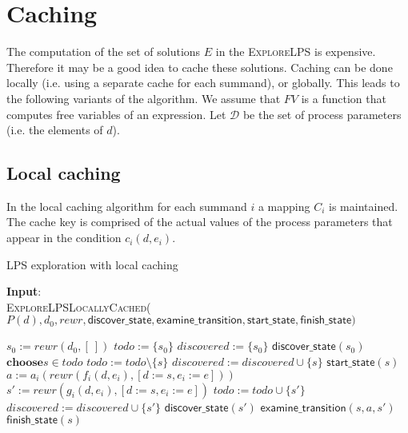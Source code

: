 \documentclass{article}
\newcommand{\emptymap}{\ensuremath{\{ : \}}}
\begin{document}
\newpage
\section{Caching}
The computation of the set of solutions $E$ in the \textsc{ExploreLPS} is expensive. Therefore it may be a good idea to cache these solutions. Caching can be done locally (i.e. using a separate cache for each summand),
or globally. This leads to the following variants of the algorithm. We assume that $FV$ is a function that
computes free variables of an expression. Let $\mathcal{D}$ be the set of process parameters
(i.e. the elements of $d$).

\subsection{Local caching}
In the local caching algorithm for each summand $i$ a mapping $C_i$ is maintained. The cache key is comprised of the actual values of the process parameters that appear in the condition $c_i(d, e_i)$.

\begin{algorithm}
\small
\caption{LPS exploration with local caching}
\vspace*{1ex}
{\textbf{Input}:} \\
\textsc{ExploreLPSLocallyCached}($P(d), d_0, rewr, \textsf{discover\_state}, \textsf{examine\_transition}, \textsf{start\_state}, \textsf{finish\_state})$
\begin{algorithmic}[1]
\State $s_0 := rewr(d_0, [\:])$
\State $todo := \{ s_0 \}$
\State $discovered := \{ s_0 \}$
\State $\textsf{discover\_state}(s_0)$
  \State \colored{  $C_i := \emptymap$}
  \State {}
\EndFor
{}
  \State $\textbf{choose} s \in todo$
  \State $todo := todo \setminus \{s\}$
  \State $discovered := discovered \cup \{s\}$
  \State $\textsf{start\_state}(s)$
    \State {}
      \State {}
    \Else
      \State {}
      \State {}
    \EndIf  
      \State $a := a_i(rewr(f_i(d,e_i), [d:=s,e_i:=e]))$
      \State $s' := rewr(g_i(d,e_i), [d:=s,e_i:=e])$
        \State $todo := todo \cup \{ s' \}$
        \State $discovered := discovered \cup \{s'\}$
        \State $\textsf{discover\_state}(s')$
      \EndIf
      \State $\textsf{examine\_transition}(s, a, s')$
    \EndFor
  \EndFor
  \State $\textsf{finish\_state}(s)$
\EndWhile
\end{algorithmic}
\end{algorithm}
\end{document}
